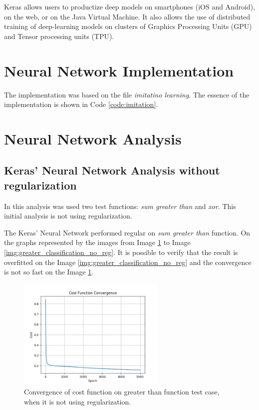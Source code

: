 \documentclass[journal]{IEEEtran}
\begin{document}
Keras allows users to productize deep models on smartphones (iOS and Android), on the web, or on the Java Virtual Machine. It also allows the use of distributed training of deep-learning models on clusters of Graphics Processing Units (GPU) and Tensor processing units (TPU).

\section{Neural Network Implementation}

The implementation was based on the file \textit{imitatino learning}. The essence of the implementation is shown in Code \ref{code:imitation}.



\section{Neural Network Analysis}

\subsection{Keras' Neural Network Analysis without regularization}

In this analysis was used two test functions: \textit{sum greater than} and \textit{xor}. This initial analysis is not using regularization.

The Keras' Neural Network performed regular on \textit{sum greater than} function. On the graphs represented by the images from Image \ref{img:greater_cost_no_reg} to Image \ref{img:greater_classification_no_reg}. It is possible to verify that the result is overfitted on the Image \ref{img:greater_classification_no_reg} and the convergence is not so fast on the Image \ref{img:greater_cost_no_reg}.

\begin{figure}
  \begin{center}
  \includegraphics[width=2.8in]{./../code/sgz_result/convergence_sgz_l0_0.png}
  \caption{Convergence of cost function on greater than function test case, when it is not using regularization.}
  \label{img:greater_cost_no_reg}
  \end{center}
\end{figure}
\end{document}
